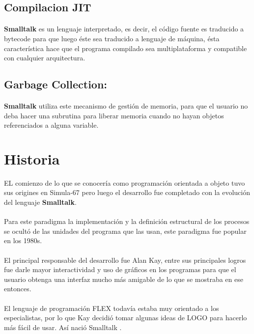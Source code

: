 \documentclass[11pt]{article}
\begin{document}
\subsection{\textbf{Compilacion JIT}}
\paragraph{} \noindent
\textbf{Smalltalk} es un lenguaje interpretado, es decir, el código fuente es traducido a bytecode para que luego éste sea traducido a lenguaje de máquina, ésta característica hace que el programa compilado sea multiplataforma y compatible con cualquier arquitectura.
\subsection{\textbf{Garbage Collection:}}
\paragraph{} \noindent
\textbf{Smalltalk} utiliza este mecanismo de gestión de memoria, para que el usuario no deba hacer una subrutina para liberar memoria cuando no hayan objetos referenciados a alguna variable.\cite{blog}
\section{\textbf{Historia}}
\paragraph{} \noindent
EL comienzo de lo que se conocería como programación orientada a objeto tuvo sus origines en Simula-67 pero luego el desarrollo fue completado con la evolución del lenguaje \textbf{Smalltalk}.
\paragraph{} \noindent
Para este paradigma la implementación y la definición estructural de los procesos se ocultó de las unidades del programa que las usan, este paradigma fue popular en los 1980s.
\paragraph{} \noindent
El principal responsable del desarrollo fue Alan Kay, entre sus principales logros fue darle mayor interactividad y uso de gráficos en los programas para que el usuario obtenga una interfaz mucho más amigable de lo que se mostraba en ese entonces.
\paragraph{} \noindent
El lenguaje de programación FLEX todavía estaba muy orientado a los especialistas, por lo que Kay decidió tomar algunas ideas de LOGO para hacerlo más fácil de usar. Así nació Smalltalk \cite{cinvestav}.
\end{document}
